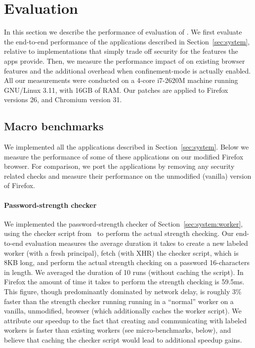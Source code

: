 \section{Evaluation}
\label{sec:eval}

In this section we describe the performance of evaluation of \sys{}.
%
We first evaluate the end-to-end performance of the \sys{}
applications described in Section~\ref{sec:system}, relative to
implementations that simply trade off security for the features the
apps provide.
%
Then, we measure the performance impact of \sys{} on existing browser
features and the additional overhead when confinement-mode is actually
enabled.
%
All our measurements were conducted on a 4-core i7-2620M machine
running GNU/Linux 3.11, with 16GB of RAM.
%
Our patches are applied to Firefox versions 26, and Chromium version
31.
%


\subsection{Macro benchmarks}
\label{sec:eval:macro}

We implemented all the applications described in
Section~\ref{sec:system}.
%
Below we measure the performance of some of these applications on our
modified Firefox browser.
%
For comparison, we port the applications by removing any security
related checks and measure their performance on the unmodified
(vanilla) version of Firefox.

\paragraph{Password-strength checker}
%
We implemented the password-strength checker of
Section~\ref{sec:system:worker}, using the checker script
from~\cite{checker1} to perform the actual strength checking.
%
Our end-to-end evaluation measures the average duration it takes to
create a new labeled worker (with a fresh principal), fetch (with XHR)
the checker script, which is 8KB long, and perform the actual strength
checking on a password 16-characters in length.
%
We averaged the duration of 10 runs (without caching the script).
%
In Firefox the amount of time it takes to perform the strength
checking is 59.5ms.
%
This figure, though predominantly dominated by network delay, is
roughly 3\% faster than the strength checker running running in a
``normal'' worker on a vanilla, unmodified, browser (which
additionally caches the worker script).
%
We attribute our speedup to the fact that creating and communicating
with labeled workers is faster than existing workers (see
micro-benchmarks, below), and believe that caching the checker script
would lead to additional speedup gains.


